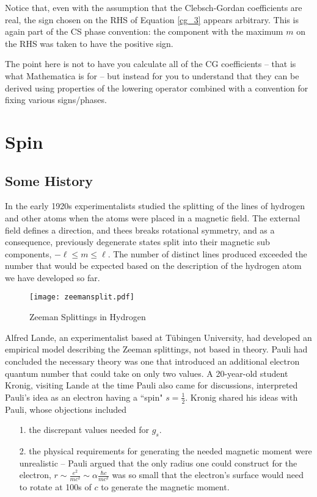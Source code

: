 Notice that, even with the assumption that the Clebsch-Gordan coefficients are
real, the sign chosen on the RHS of Equation \ref{cg_3} appears arbitrary. This
is again part of the CS phase convention: the component with the maximum $m$ on
the RHS was taken to have the positive sign. 

The point here is not to have you calculate all of the CG coefficients -- that
is what Mathematica is for -- but instead for you to understand that they can
be derived using properties of the lowering operator combined with a convention
for fixing various signs/phases. 


\section{Spin} 

\subsection{Some History}

In the early 1920s experimentalists studied the splitting of the lines of
hydrogen and other atoms when the atoms were placed in a magnetic field. The
external field defines a direction, and thees breaks rotational symmetry, and
as a consequence, previously degenerate states split into their magnetic sub
components, $-\ell \leq m \leq \ell$. The number of distinct lines produced
exceeded the number that would be expected based on the description of the
hydrogen atom we have developed so far. 

\begin{figure}[H]
  \centering
    \texttt{[image: zeemansplit.pdf]}
    \caption{Zeeman Splittings in Hydrogen}
    \label{zeemansplit}
\end{figure}

Alfred Lande, an experimentalist based at T\"ubingen University, had developed
an empirical model describing the Zeeman splittings, not based in theory. Pauli
had concluded the necessary theory was one that introduced an additional
electron quantum number that could take on only two values. A 20-year-old
student Kronig, visiting Lande at the time Pauli also came for discussions,
interpreted Pauli's idea as an electron having a ``spin" $s = \frac{1}{2}$.
Kronig shared his ideas with Pauli, whose objections included 

\begin{itemize}
  \item[1.] the discrepant values needed for $g_s$. 
  \item[2.] the physical requirements for generating the needed magnetic moment
    were unrealistic -- Pauli argued that the only radius one could construct
    for the electron, $r \sim \frac{e^2}{mc^2} \sim \alpha \frac{\hbar
    c}{mc^2}$ was so small that the electron's surface would need to rotate at
    100s of $c$ to generate the magnetic moment. 
\end{itemize}

